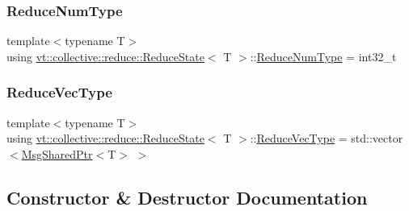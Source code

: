 \subsubsection{\texorpdfstring{Reduce\+Num\+Type}{ReduceNumType}}
{\footnotesize\ttfamily template$<$typename T$>$ \\
using \hyperlink{structvt_1_1collective_1_1reduce_1_1_reduce_state}{vt\+::collective\+::reduce\+::\+Reduce\+State}$<$ T $>$\+::\hyperlink{structvt_1_1collective_1_1reduce_1_1_reduce_state_adda7ff0ae58325a43a0a8bad447a8bfb}{Reduce\+Num\+Type} =  int32\+\_\+t}

\mbox{\label{structvt_1_1collective_1_1reduce_1_1_reduce_state_a2336f24c27986fdf5131a3a19bf75107}} 
\subsubsection{\texorpdfstring{Reduce\+Vec\+Type}{ReduceVecType}}
{\footnotesize\ttfamily template$<$typename T$>$ \\
using \hyperlink{structvt_1_1collective_1_1reduce_1_1_reduce_state}{vt\+::collective\+::reduce\+::\+Reduce\+State}$<$ T $>$\+::\hyperlink{structvt_1_1collective_1_1reduce_1_1_reduce_state_a2336f24c27986fdf5131a3a19bf75107}{Reduce\+Vec\+Type} =  std\+::vector$<$\hyperlink{namespacevt_ab2b3d506ec8e8d1540aede826d84a239}{Msg\+Shared\+Ptr}$<$T$>$ $>$}



\subsection{Constructor \& Destructor Documentation}
\mbox{\label{structvt_1_1collective_1_1reduce_1_1_reduce_state_aab33d1a9b78e1663ff14497d2b64829c}} 
